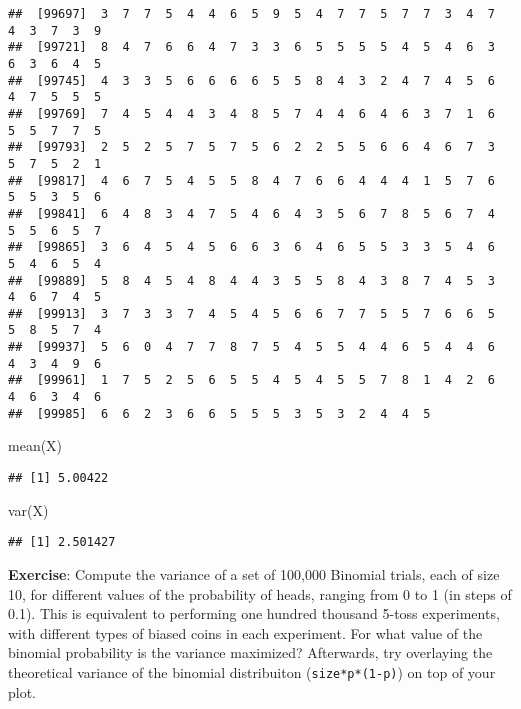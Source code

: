 \documentclass[
]{book}
\newenvironment{Shaded}{\begin{snugshade}}{\end{snugshade}}
\newcommand{\FunctionTok}[1]{\textcolor[rgb]{0.00,0.00,0.00}{#1}}
\newcommand{\NormalTok}[1]{#1}
\begin{document}
\begin{verbatim}
##  [99697]  3  7  7  5  4  4  6  5  9  5  4  7  7  5  7  7  3  4  7  4  3  7  3  9
##  [99721]  8  4  7  6  6  4  7  3  3  6  5  5  5  5  4  5  4  6  3  6  3  6  4  5
##  [99745]  4  3  3  5  6  6  6  6  5  5  8  4  3  2  4  7  4  5  6  4  7  5  5  5
##  [99769]  7  4  5  4  4  3  4  8  5  7  4  4  6  4  6  3  7  1  6  5  5  7  7  5
##  [99793]  2  5  2  5  7  5  7  5  6  2  2  5  5  6  6  4  6  7  3  5  7  5  2  1
##  [99817]  4  6  7  5  4  5  5  8  4  7  6  6  4  4  4  1  5  7  6  5  5  3  5  6
##  [99841]  6  4  8  3  4  7  5  4  6  4  3  5  6  7  8  5  6  7  4  5  5  6  5  7
##  [99865]  3  6  4  5  4  5  6  6  3  6  4  6  5  5  3  3  5  4  6  5  4  6  5  4
##  [99889]  5  8  4  5  4  8  4  4  3  5  5  8  4  3  8  7  4  5  3  4  6  7  4  5
##  [99913]  3  7  3  3  7  4  5  4  5  6  6  7  7  5  5  7  6  6  5  5  8  5  7  4
##  [99937]  5  6  0  4  7  7  8  7  5  4  5  5  4  4  6  5  4  4  6  4  3  4  9  6
##  [99961]  1  7  5  2  5  6  5  5  4  5  4  5  5  7  8  1  4  2  6  4  6  3  4  6
##  [99985]  6  6  2  3  6  6  5  5  5  3  5  3  2  4  4  5
\end{verbatim}

\begin{Shaded}
\begin{Highlighting}[]
\FunctionTok{mean}\NormalTok{(X)}
\end{Highlighting}
\end{Shaded}

\begin{verbatim}
## [1] 5.00422
\end{verbatim}

\begin{Shaded}
\begin{Highlighting}[]
\FunctionTok{var}\NormalTok{(X)}
\end{Highlighting}
\end{Shaded}

\begin{verbatim}
## [1] 2.501427
\end{verbatim}

\textbf{Exercise}: Compute the variance of a set of 100,000 Binomial trials, each of size 10, for different values of the probability of heads, ranging from 0 to 1 (in steps of 0.1). This is equivalent to performing one hundred thousand 5-toss experiments, with different types of biased coins in each experiment. For what value of the binomial probability is the variance maximized? Afterwards, try overlaying the theoretical variance of the binomial distribuiton (\texttt{size*p*(1-p)}) on top of your plot.
\end{document}
